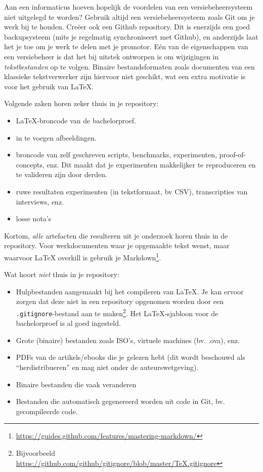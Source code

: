 Aan een informaticus hoeven hopelijk de voordelen van een versiebeheersysteem niet uitgelegd te worden? Gebruik altijd een versiebeheersysteem zoals Git om je werk bij te houden. Creëer ook een Github repository. Dit is enerzijds een goed backupsysteem (mits je regelmatig synchroniseert met Github), en anderzijds laat het je toe om je werk te delen met je promotor. Eén van de eigenschappen van een versiebeheer is dat het bij uitstek ontworpen is om wijzigingen in \emph{tekstbestanden} op te volgen. Binaire bestandsformaten zoals documenten van een klassieke tekstverwerker zijn hiervoor niet geschikt, wat een extra motivatie is voor het gebruik van \LaTeX{}.

Volgende zaken horen zeker thuis in je repository:

\begin{itemize}
  \item \LaTeX{}-broncode van de bachelorproef.
  \item in te voegen afbeeldingen.
  \item broncode van zelf geschreven scripts, benchmarks, experimenten, proof-of-concepts, enz. Dit maakt dat je experimenten makkelijker te reproduceren en te valideren zijn door derden.
  \item ruwe resultaten experimenten (in tekstformaat, bv CSV), transcripties van interviews, enz.
  \item losse nota's
\end{itemize}

Kortom, \emph{alle} artefacten die resulteren uit je onderzoek horen thuis in de repository. Voor werkdocumenten waar je opgemaakte tekst wenst, maar waarvoor \LaTeX{} overkill is gebruik je Markdown\footnote{\url{https://guides.github.com/features/mastering-markdown/}}.

Wat hoort \emph{niet} thuis in je repository:

\begin{itemize}
  \item Hulpbestanden aangemaakt bij het compileren van \LaTeX{}. Je kan ervoor zorgen dat deze niet in een repository opgenomen worden door een \texttt{.gitignore}-bestand aan te maken\footnote{Bijvoorbeeld \url{https://github.com/github/gitignore/blob/master/TeX.gitignore}}. Het \LaTeX{}-sjabloon voor de bachelorproef is al goed ingesteld.
  \item Grote (binaire) bestanden zoals ISO's, virtuele machines (bv. .ova), enz.
  \item PDFs van de artikels/ebooks die je gelezen hebt (dit wordt beschouwd als ``herdistribueren'' en mag niet onder de auteurswetgeving).
  \item Binaire bestanden die vaak veranderen
  \item Bestanden die automatisch gegenereerd worden uit code in Git, bv. gecompileerde code.
\end{itemize}

